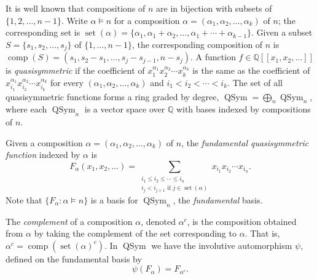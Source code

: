 \documentclass[12pt,letterpaper]{amsart}
\newcommand{\bQ}{\mathbb{Q}}
\theoremstyle{definition}
\DeclareMathOperator{\comp}{comp}
\DeclareMathOperator{\set}{set}
\DeclareMathOperator{\QSym}{QSym}
\begin{document}
It is well known that compositions of $n$ are in bijection with subsets of $\{1,2,\ldots,n-1\}$.  Write $\alpha\vDash n$ for a composition $\alpha = (\alpha_1, \alpha_2,\ldots,\alpha_k)$ of $n$; the corresponding set is $\set(\alpha) = \{\alpha_1,\alpha_1+\alpha_2,\ldots,\alpha_1+\cdots+\alpha_{k-1}\}$.
Given a subset $S=\{s_1,s_2,\ldots,s_j\}$ of $\{1,\ldots,n-1\}$, the corresponding composition of $n$ is $\comp(S)=(s_1,s_2-s_1,\ldots,s_j-s_{j-1},n-s_j)$. 
A function $f\in \bQ[[x_1,x_2,\ldots]]$ is {\em quasisymmetric} if the coefficient of $x_1^{\alpha_1}x_2^{\alpha_2}\cdots x_k^{\alpha_k}$ is the same as the coefficient of $x_{i_1}^{\alpha_1}x_{i_2}^{\alpha_2}\cdots x_{i_k}^{\alpha_k}$ for every $(\alpha_1, \alpha_2,\ldots,\alpha_k)$ and $i_1<i_2<\cdots <i_k$.  The set of all quasisymmetric functions forms a ring graded by degree, $\QSym = \bigoplus_{n} \QSym_n$, where each $\QSym_n$ is a vector space over $\bQ$ with bases indexed by compositions of $n$. 

Given a composition $\alpha=(\alpha_1,\alpha_2,\ldots,\alpha_k)$ of $n$, the {\em fundamental quasisymmetric function} indexed by $\alpha$ is 
\[F_\alpha(x_1,x_2,\ldots) = \sum_{\substack{i_1\leq i_2\leq \cdots \leq i_n\\i_j<i_{j+1} \text{ if } j\in\set(\alpha)}} x_{i_1}x_{i_2}\cdots x_{i_n}.\]
Note that 
$\{F_\alpha:\alpha\vDash n\}$ is a basis for $\QSym_n$, the \emph{fundamental} basis.

The {\em complement} of a composition $\alpha$, denoted $\alpha^c$, is the composition obtained from $\alpha$ by taking the complement of the set corresponding to  $\alpha$.  That is, 
$\alpha^c= \comp(\set(\alpha)^c)$.
 In $\QSym$ we have the involutive automorphism   $\psi,$ defined on the fundamental basis by
\begin{equation}
\psi(F_\alpha) = F_{\alpha^c} \label{eqn:psiF}.
\end{equation}
\end{document}
